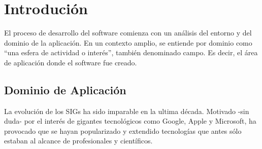 \chapter[Introducción]{
  \label{chp:introduccion}
  Introdución
}
\minitoc
\newpage

El proceso de desarrollo del software comienza con un análisis del entorno y
del dominio de la aplicación. En un contexto amplio, se entiende por dominio
como ``una esfera de actividad o interés'', también denominado campo. Es decir,
el área de aplicación donde el software fue creado.



\section{Dominio de Aplicación}

La evolución de los \glspl{SIG} ha sido imparable en la ultima década. Motivado 
-sin duda- por el interés de gigantes tecnológicos como Google, Apple y Microsoft, 
ha provocado que se hayan popularizado y extendido tecnologías que  antes sólo 
estaban al alcance de profesionales y científicos.

